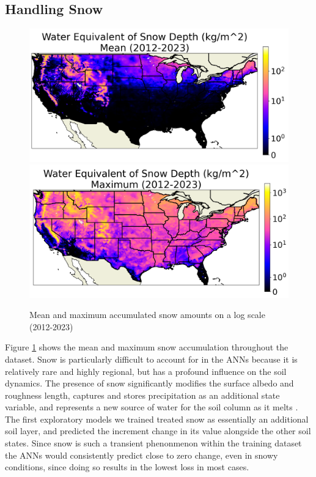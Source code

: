 \subsection{Handling Snow}

\begin{figure}[hb!]
    \centering
    \includegraphics[width=.48\linewidth]{figures/thesis-gridstats/gridstat-bulk_weasd-log_2012-1_2023-12_y000-195_x000-462_mean.png}
    \includegraphics[width=.48\linewidth]{figures/thesis-gridstats/gridstat-bulk_weasd-log_2012-1_2023-12_y000-195_x000-462_max.png}
    \caption{Mean and maximum accumulated snow amounts on a log scale (2012-2023)}
    \label{gs-snow}
\end{figure}

Figure \ref{gs-snow} shows the mean and maximum snow accumulation throughout the dataset. Snow is particularly difficult to account for in the ANNs because it is relatively rare and highly regional, but has a profound influence on the soil dynamics. The presence of snow significantly modifies the surface albedo and roughness length, captures and stores precipitation as an additional state variable, and represents a new source of water for the soil column as it melts \citep{koren_parameterization_1999}. The first exploratory models we trained treated snow as essentially an additional soil layer, and predicted the increment change in its value alongside the other soil states. Since snow is such a transient phenonmenon within the training dataset the ANNs would consistently predict close to zero change, even in snowy conditions, since doing so results in the lowest loss in most cases.

